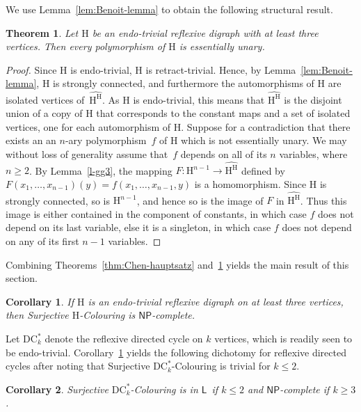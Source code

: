 \documentclass[a4paper,12pt]{article}
\newtheorem{theorem}{Theorem}
\newtheorem{corollary}{Corollary}
\theoremstyle{remark}
\newcommand{\LL}[0]{\ensuremath{\mathsf{L}}}
\newcommand{\NP}[0]{\ensuremath{\mathsf{NP}}}
\newcommand{\DC}[0]{\ensuremath{\mathrm{DC}}}
\renewcommand{\H}{\ensuremath{\mathrm{H}}}
\begin{document}
\noindent We use Lemma~\ref{lem:Benoit-lemma} to obtain the following structural result.

\begin{theorem} Let $\H$ be  
an endo-trivial 
reflexive digraph with at least three vertices. Then every polymorphism of  $\H$ is essentially unary.  
\label{cor:Benoit}
\end{theorem}

\begin{proof} 
Since $\H$ is endo-trivial, $\H$ is retract-trivial. Hence, 
by Lemma~\ref{lem:Benoit-lemma}, $\H$ is strongly connected, and furthermore the automorphisms of $\H$ are isolated vertices of~$\widehat{\H^{\H}}$. As $\H$ is endo-trivial, this means that  $\widehat{\H^{\H}}$  is the disjoint union of a copy of $\H$ that corresponds to the constant maps and a set of isolated vertices, one for each automorphism of $\H$.
Suppose for a contradiction that there exists an  an $n$-ary polymorphism~$f$ of $\H$ which is not essentially unary.
We may without loss of generality assume that~$f$ depends on all of its $n$ variables, where $n \geq 2$. 
By Lemma~\ref{l-gg3}, 
 the mapping $F:\H^{n-1} \rightarrow \widehat{\H^{\H}}$ defined by $F(x_1,\ldots,x_{n-1})(y) = f(x_1,\ldots,x_{n-1},y)$ is a homomorphism. Since $\H$ is strongly connected, so is $\H^{n-1}$, and hence so is the image of $F$ in $\widehat{\H^{\H}}$. Thus this image is either contained in the component of constants, in which case $f$ does not depend on its last variable, else it is a singleton, in which case $f$ does not depend on any of its first $n-1$ variables. \end{proof}

Combining Theorems~\ref{thm:Chen-hauptsatz} and~\ref{cor:Benoit} yields the main result of this section.

\begin{corollary}\label{c-main}
If $\H$ is an endo-trivial reflexive digraph on at least three vertices, then {\sc Surjective $\H$-Colouring} is \NP-complete. 
\end{corollary}

Let $\DC^*_k$ denote the reflexive directed cycle on $k$ vertices, which is readily seen to be endo-trivial. Corollary~\ref{c-main}
yields the following dichotomy for reflexive directed cycles after noting that {\sc Surjective $\DC^*_k$-Colouring} is trivial for $k\leq 2$.

\begin{corollary}
{\sc Surjective $\DC^*_k$-Colouring} is in \LL\ if $k\leq 2$ and \NP-complete if $k\geq 3$.
\end{corollary}
\end{document}
